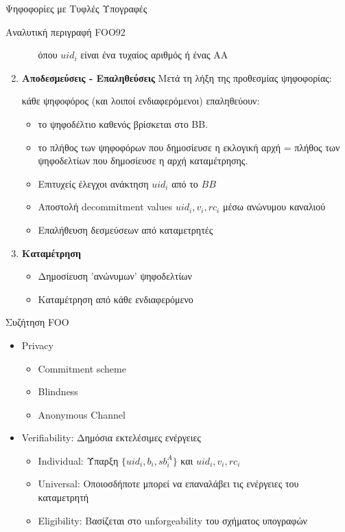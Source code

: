 \documentclass[handout]{beamer}
\begin{document}
\begin{section}{Ψηφοφορίες με Τυφλές Υπογραφές}
\begin{frame}[allowframebreaks]{Αναλυτική περιγραφή FOO92}
\begin{enumerate}
\begin{itemize}
όπου $uid_i$ είναι ένα τυχαίος αριθμός ή ένας ΑΑ
\end{itemize}

\framebreak

\item \textbf{Αποδεσμεύσεις - Επαληθεύσεις}
Μετά τη λήξη της προθεσμίας ψηφοφορίας:

κάθε ψηφοφόρος (και λοιποί ενδιαφερόμενοι) επαληθεύουν:

\begin{itemize}
\item το ψηφοδέλτιο καθενός βρίσκεται στο BB.
\item το πλήθος των ψηφοφόρων που δημοσίευσε η εκλογική αρχή =  πλήθος των ψηφοδελτίων που δημοσίευσε η αρχή καταμέτρησης. 
\item Επιτυχείς έλεγχοι ανάκτηση $uid_i$ από το $BB$
\item Aποστολή decommitment values $uid_i,v_i,rc_i$ μέσω ανώνυμου καναλιού
\item Επαλήθευση δεσμεύσεων από καταμετρητές
\end{itemize}

\framebreak

\item \textbf{Καταμέτρηση}
\begin{itemize}
\item Δημοσίευση 'ανώνυμων' ψηφοδελτίων
\item Καταμέτρηση από κάθε ενδιαφερόμενο  
\end{itemize}
\end{enumerate}

\end{frame}


\begin{frame}{Συζήτηση FOO}
\begin{itemize}
\item Privacy
    \begin{itemize}
            \item Commitment scheme
            \item Blindness 
            \item Anonymous Channel
    \end{itemize} \pause
\item Verifiability: Δημόσια εκτελέσιμες ενέργειες
\begin{itemize}
    \item Individual: Ύπαρξη $\{ uid_i, b_i, sb_i^A \}$ και $uid_i,v_i,rc_i$
    \item Universal: Οποιοσδήποτε μπορεί να επαναλάβει τις ενέργειες του καταμετρητή 
    \item Eligibility: Βασίζεται στο unforgeability του σχήματος υπογραφών
\end{itemize}
\end{itemize}
\end{frame}


\end{section} 
 
\end{document}

